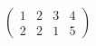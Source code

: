 \documentclass[12pt, a4paper, titlepage]{book}
\begin{document}
$\left( \begin{array}{ccc|c}
1 & 2 & 3 & 4 \\
2 & 2 & 1 & 5
\end{array} \right)$
\end{document}
